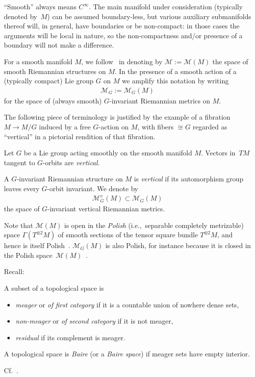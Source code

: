 \documentclass[10pt,a4paper]{amsart}
\numberwithin{equation}{section}
\begin{document}
``Smooth'' always means $C^{\infty}$. The main manifold under consideration (typically denoted by~$M$) can be assumed boundary-less, but various auxiliary submanifolds thereof will, in general, have boundaries or be non-compact: in those cases the arguments will be local in nature, so the non-compactness and/or presence of a boundary will not make a difference.

For a smooth manifold $M$, we follow~\cite{eb} in denoting by $\mathcal{M}:=\mathcal{M}(M)$ the space of smooth Riemannian structures on $M$. In the presence of a smooth action of a (typically compact) Lie group $G$ on $M$ we amplify this notation by writing
\begin{gather*}
 \mathcal{M}_G:=\mathcal{M}_G(M)
\end{gather*}
for the space of (always smooth) $G$-invariant Riemannian metrics on $M$.

The following piece of terminology is justified by the example of a fibration $M\to M/G$ induced by a free $G$-action on $M$, with fibers $\cong G$ regarded as ``vertical'' in a pictorial rendition of that fibration.

\begin{Definition}\label{def:vert}
 Let $G$ be a Lie group acting smoothly on the smooth manifold $M$. Vectors in~$TM$ tangent to $G$-orbits are {\it vertical}.

 A $G$-invariant Riemannian structure on $M$ is {\it vertical} if its automorphism group leaves every $G$-orbit invariant. We denote by
 \begin{gather*}
 \mathcal{M}_G^v(M)\subset \mathcal{M}_G(M)
 \end{gather*}
 the space of $G$-invariant vertical Riemannian metrics.
\end{Definition}

Note that $\mathcal{M}(M)$ is open in the {\it Polish} (i.e.,~separable completely metrizable) space $\Gamma(T^{\otimes 2}M)$ of smooth sections of the tensor square bundle $T^{\otimes 2}M$, and hence is itself Polish~\cite[Appen\-dix, Proposition~A.1]{trev}. $\mathcal{M}_G(M)$ is also Polish, for instance because it is closed in the Polish space~$\mathcal{M}(M)$~\cite[Chapter~IX, Section~6.1, Proposition~1a)]{bour-top-2}.

Recall:

\begin{Definition}\label{def:cat1}
 A subset of a topological space is
 \begin{itemize}\itemsep=0pt
 \item {\it meager} or {\it of first category} if it is a countable union of nowhere dense sets,
 \item {\it non-meager} or {\it of second category} if it is not meager,
 \item {\it residual} if its complement is meager.
 \end{itemize}

 A topological space is {\it Baire} (or a {\it Baire space}) if meager sets have empty interior.
\end{Definition}
Cf.~\cite[Definitions 11.6.1 and 11.6.5]{nb}.
\end{document}
